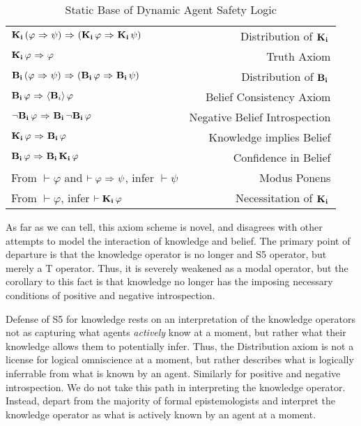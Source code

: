 \begin{table}[H]
	\begin{center}
		\begin{tabular}{| l r |}
			\hline
			$\mathbf{K}_{\mathbf{i}}\,(\varphi {\ \Rightarrow \ } \psi) {\ \Rightarrow \ } (\mathbf{K}_{\mathbf{i}}\,\varphi {\ \Rightarrow \ } \mathbf{K}_{\mathbf{i}}\,\psi)$ & Distribution of $\mathbf{K}_{\mathbf{i}}\,$ \\
			$\mathbf{K}_{\mathbf{i}}\,\varphi {\ \Rightarrow \ } \varphi$ & Truth Axiom \\
			$\mathbf{B}_{\mathbf{i}}\,(\varphi {\ \Rightarrow \ } \psi) {\ \Rightarrow \ } (\mathbf{B}_{\mathbf{i}}\,\varphi {\ \Rightarrow \ } \mathbf{B}_{\mathbf{i}}\,\psi)$ & Distribution of $\mathbf{B}_{\mathbf{i}}\,$\\
			$\mathbf{B}_{\mathbf{i}}\,\varphi {\ \Rightarrow \ } \langle \mathbf{B}_{i} \rangle\,\varphi$ & Belief Consistency Axiom\\
			${\neg}\mathbf{B}_{\mathbf{i}}\,\varphi {\ \Rightarrow \ } \mathbf{B}_{\mathbf{i}}\,{\neg}\mathbf{B}_{\mathbf{i}}\,\varphi$ & Negative Belief Introspection\\
			$\mathbf{K}_{\mathbf{i}}\,\varphi {\ \Rightarrow \ } \mathbf{B}_{\mathbf{i}}\,\varphi$ & Knowledge implies Belief \\
			$\mathbf{B}_{\mathbf{i}}\,\varphi {\ \Rightarrow \ } \mathbf{B}_{\mathbf{i}}\,\mathbf{K}_{\mathbf{i}}\,\varphi$ & Confidence in Belief\\
			From $\vdash \varphi$ and $\vdash \varphi {\ \Rightarrow \ } \psi$, infer $\vdash\psi$ & Modus Ponens\\
			From $\vdash \varphi$, infer $\vdash \mathbf{K}_{\mathbf{i}}\,\varphi$ & Necessitation of $\mathbf{K}_{\mathbf{i}}\,$\\
			\hline
		\end{tabular}
		\caption{Static Base of Dynamic Agent Safety Logic}
	\end{center}
\end{table}

As far as we can tell, this axiom scheme is novel, and disagrees with other attempts to model the interaction of knowledge and belief. The primary point of departure is that the knowledge operator is no longer and S5 operator, but merely a T operator. Thus, it is severely weakened as a modal operator, but the corollary to this fact is that knowledge no longer has the imposing necessary conditions of positive and negative introspection. 

Defense of S5 for knowledge rests on an interpretation of the knowledge operators not as capturing what agents \emph{actively} know at a moment, but rather what their knowledge allows them to potentially infer. Thus, the Distribution axiom is not a license for logical omniscience at a moment, but rather describes what is logically inferrable from what is known by an agent. Similarly for positive and negative introspection. We do not take this path in interpreting the knowledge operator. Instead, depart from the majority of formal epistemologists and interpret the knowledge operator as what is actively known by an agent at a moment.

